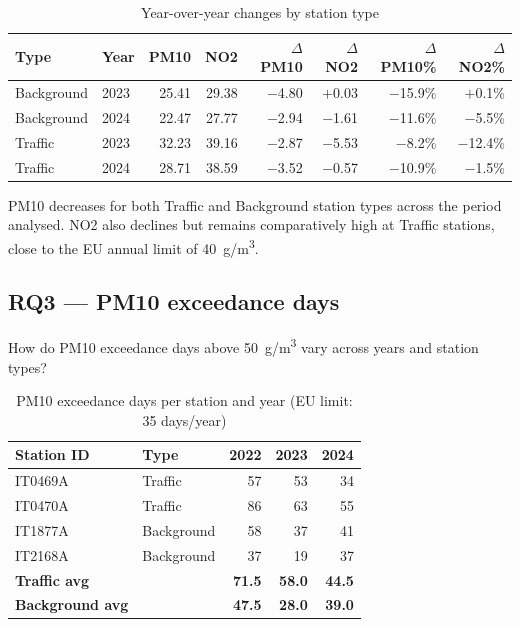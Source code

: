 \documentclass[11pt,a4paper]{article}
\begin{document}
\begin{table}[h!]
\centering
\caption{Year-over-year changes by station type}
\small
{}
\begin{tabular}{@{}llrrrrrr@{}}
\toprule
\textbf{Type} & \textbf{Year} & \textbf{PM10} & \textbf{NO2} & \textbf{$\Delta$PM10} & \textbf{$\Delta$NO2} & \textbf{$\Delta$PM10\%} & \textbf{$\Delta$NO2\%} \\
\midrule
Background & 2023 & 25.41 & 29.38 & $-$4.80 & $+$0.03 & $-$15.9\% & $+$0.1\% \\
Background & 2024 & 22.47 & 27.77 & $-$2.94 & $-$1.61 & $-$11.6\% & $-$5.5\% \\
Traffic    & 2023 & 32.23 & 39.16 & $-$2.87 & $-$5.53 & $-$8.2\%  & $-$12.4\% \\
Traffic    & 2024 & 28.71 & 38.59 & $-$3.52 & $-$0.57 & $-$10.9\% & $-$1.5\% \\
\bottomrule
\end{tabular}
\end{table}

\begin{tcolorbox}[answerbox,title=Direct answer --- RQ2]
PM10 decreases for both Traffic and Background station types across the period analysed.
NO2 also declines but remains comparatively high at Traffic stations, close to the EU annual
limit of 40~\textmu g/m\textsuperscript{3}.
\end{tcolorbox}

\subsection{RQ3 --- PM10 exceedance days}

\begin{tcolorbox}[rqbox,title=Research Question 3]
How do PM10 exceedance days above 50~\textmu g/m\textsuperscript{3} vary across years and station types?
\end{tcolorbox}

\begin{table}[h!]
\centering
\caption{PM10 exceedance days per station and year (EU limit: 35 days/year)}
\small
{}
\begin{tabular}{@{}llrrr@{}}
\toprule
\textbf{Station ID} & \textbf{Type} & \textbf{2022} & \textbf{2023} & \textbf{2024} \\
\midrule
IT0469A & Traffic    & 57 & 53 & 34 \\
IT0470A & Traffic    & 86 & 63 & 55 \\
IT1877A & Background & 58 & 37 & 41 \\
IT2168A & Background & 37 & 19 & 37 \\
\midrule
\textbf{Traffic avg}    & & \textbf{71.5} & \textbf{58.0} & \textbf{44.5} \\
\textbf{Background avg} & & \textbf{47.5} & \textbf{28.0} & \textbf{39.0} \\
\bottomrule
\end{tabular}
\end{table}
\end{document}
